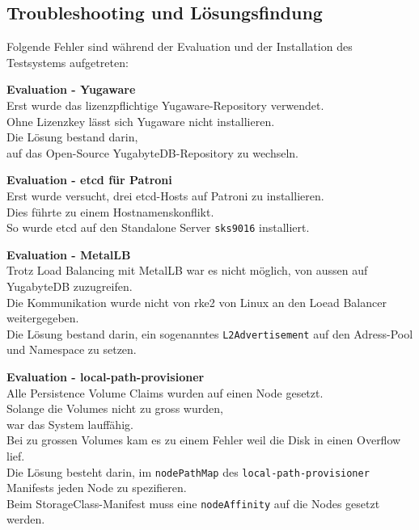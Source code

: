 
\clearpage
\begin{flushleft}
    \section{Troubleshooting und Lösungsfindung}
    Folgende Fehler sind während der Evaluation und der Installation des Testsystems aufgetreten:\\
    \begin{description}
        \item \textbf{Evaluation - Yugaware}\hfill \\Erst wurde das lizenzpflichtige Yugaware-Repository verwendet.\\Ohne Lizenzkey lässt sich Yugaware nicht installieren.\\Die Lösung bestand darin,\\auf das Open-Source YugabyteDB-Repository zu wechseln.
        \item \textbf{Evaluation - etcd für Patroni}\hfill \\Erst wurde versucht, drei etcd-Hosts auf Patroni zu installieren.\\Dies führte zu einem Hostnamenskonflikt.\\So wurde etcd auf den Standalone Server \texttt{sks9016} installiert.
        \item \textbf{Evaluation - MetalLB}\hfill \\Trotz Load Balancing mit \Gls{MetalLB} war es nicht möglich, von aussen auf YugabyteDB zuzugreifen.\\Die Kommunikation wurde nicht von \gls{rke2} von Linux an den Loead Balancer weitergegeben.\\Die Lösung bestand darin, ein sogenanntes \texttt{L2Advertisement} auf den Adress-Pool und Namespace zu setzen.
        \item \textbf{Evaluation - local-path-provisioner}\hfill \\Alle Persistence Volume Claims wurden auf einen Node gesetzt.\\Solange die Volumes nicht zu gross wurden,\\war das System lauffähig.\\Bei zu grossen Volumes kam es zu einem Fehler weil die Disk in einen Overflow lief.\\Die Lösung besteht darin, im \texttt{nodePathMap} des \texttt{\gls{local-path-provisioner}} Manifests jeden Node zu spezifieren.\\Beim StorageClass-Manifest muss eine \texttt{nodeAffinity} auf die Nodes gesetzt werden.

\end{description}
\end{flushleft}
